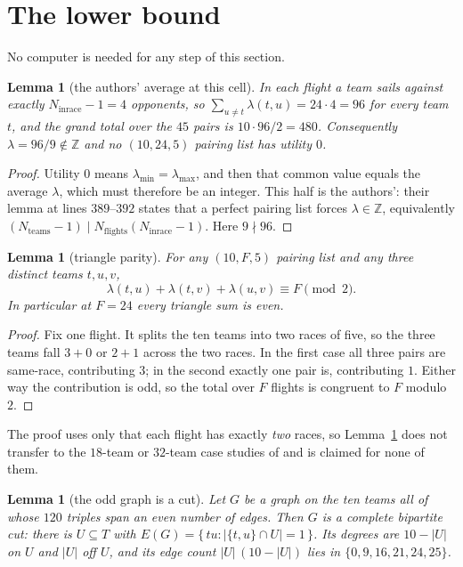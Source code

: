 \documentclass[11pt]{amsart}
\newtheorem{lemma}[theorem]{Lemma}
\theoremstyle{remark}
\begin{document}
\section{The lower bound}\label{sec:lower}

No computer is needed for any step of this section.

\begin{lemma}[the authors' average at this cell]\label{lem:A}
In each flight a team sails against exactly $N_{\mathrm{inrace}}-1=4$
opponents, so $\sum_{u\ne t}\lambda(t,u)=24\cdot4=96$ for every team $t$, and
the grand total over the $45$ pairs is $10\cdot96/2=480$. Consequently
$\lambda=96/9\notin\mathbb Z$ and no $(10,24,5)$ pairing list has utility $0$.
\end{lemma}

\begin{proof}
Utility $0$ means $\lambda_{\min}=\lambda_{\max}$, and then that common value
equals the average $\lambda$, which must therefore be an integer. This half is
the authors': their lemma at lines $389$--$392$ states that a perfect pairing
list forces $\lambda\in\mathbb Z$, equivalently
$(N_{\mathrm{teams}}-1)\mid N_{\mathrm{flights}}(N_{\mathrm{inrace}}-1)$. Here
$9\nmid96$.
\end{proof}

\begin{lemma}[triangle parity]\label{lem:B}
For any $(10,F,5)$ pairing list and any three distinct teams $t,u,v$,
\[
  \lambda(t,u)+\lambda(t,v)+\lambda(u,v)\equiv F \pmod 2 .
\]
In particular at $F=24$ every triangle sum is even.
\end{lemma}

\begin{proof}
Fix one flight. It splits the ten teams into two races of five, so the three
teams fall $3+0$ or $2+1$ across the two races. In the first case all three
pairs are same-race, contributing $3$; in the second exactly one pair is,
contributing $1$. Either way the contribution is odd, so the total over $F$
flights is congruent to $F$ modulo $2$.
\end{proof}

The proof uses only that each flight has exactly \emph{two} races, so
Lemma~\ref{lem:B} does not transfer to the $18$-team or $32$-team case studies
of \cite{SchuelerSchuermann} and is claimed for none of them.

\begin{lemma}[the odd graph is a cut]\label{lem:C}
Let $G$ be a graph on the ten teams all of whose $120$ triples span an even
number of edges. Then $G$ is a complete bipartite cut: there is
$U\subseteq T$ with $E(G)=\{\,tu: |\{t,u\}\cap U|=1\,\}$. Its degrees are
$10-|U|$ on $U$ and $|U|$ off $U$, and its edge count $|U|\,(10-|U|)$ lies in
$\{0,9,16,21,24,25\}$.
\end{lemma}
\end{document}
